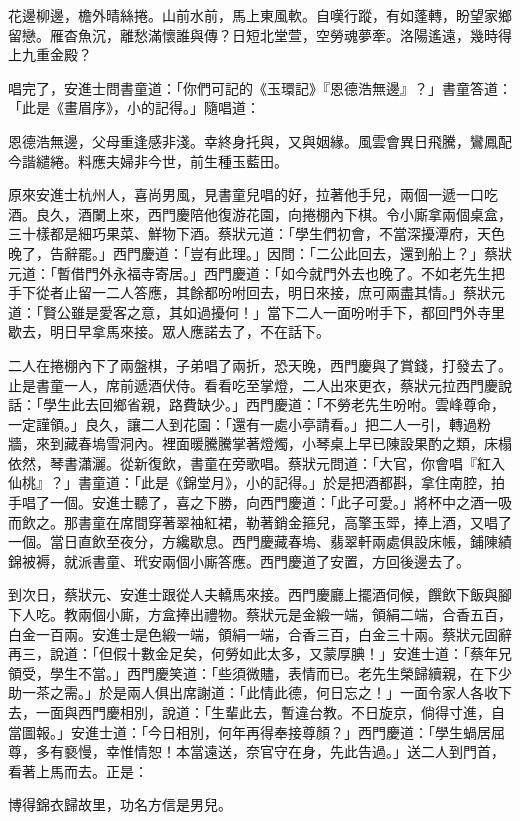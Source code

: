 花邊柳邊，檐外晴絲捲。山前水前，馬上東風軟。自嘆行蹤，有如蓬轉，盼望家鄉留戀。雁杳魚沉，離愁滿懷誰與傳？日短北堂萱，空勞魂夢牽。洛陽遙遠，幾時得上九重金殿？

唱完了，安進士問書童道：「你們可記的《玉環記》『恩德浩無邊』？」書童答道：「此是《畫眉序》，小的記得。」隨唱道：

恩德浩無邊，父母重逢感非淺。幸終身托與，又與姻緣。風雲會異日飛騰，鸞鳳配今諧繾綣。料應夫婦非今世，前生種玉藍田。

原來安進士杭州人，喜尚男風，見書童兒唱的好，拉著他手兒，兩個一遞一口吃酒。良久，酒闌上來，西門慶陪他復游花園，向捲棚內下棋。令小廝拿兩個桌盒，三十樣都是細巧果菜、鮮物下酒。蔡狀元道：「學生們初會，不當深擾潭府，天色晚了，告辭罷。」西門慶道：「豈有此理。」因問：「二公此回去，還到船上？」蔡狀元道：「暫借門外永福寺寄居。」西門慶道：「如今就門外去也晚了。不如老先生把手下從者止留一二人答應，其餘都吩咐回去，明日來接，庶可兩盡其情。」蔡狀元道：「賢公雖是愛客之意，其如過擾何！」當下二人一面吩咐手下，都回門外寺里歇去，明日早拿馬來接。眾人應諾去了，不在話下。

二人在捲棚內下了兩盤棋，子弟唱了兩折，恐天晚，西門慶與了賞錢，打發去了。止是書童一人，席前遞酒伏侍。看看吃至掌燈，二人出來更衣，蔡狀元拉西門慶說話：「學生此去回鄉省親，路費缺少。」西門慶道：「不勞老先生吩咐。雲峰尊命，一定謹領。」良久，讓二人到花園：「還有一處小亭請看。」把二人一引，轉過粉牆，來到藏春塢雪洞內。裡面暖騰騰掌著燈燭，小琴桌上早已陳設果酌之類，床榻依然，琴書瀟灑。從新復飲，書童在旁歌唱。蔡狀元問道：「大官，你會唱『紅入仙桃』？」書童道：「此是《錦堂月》，小的記得。」於是把酒都斟，拿住南腔，拍手唱了一個。安進士聽了，喜之下勝，向西門慶道：「此子可愛。」將杯中之酒一吸而飲之。那書童在席間穿著翠袖紅裙，勒著銷金箍兒，高擎玉斝，捧上酒，又唱了一個。當日直飲至夜分，方纔歇息。西門慶藏春塢、翡翠軒兩處俱設床帳，鋪陳績錦被褥，就派書童、玳安兩個小廝答應。西門慶道了安置，方回後邊去了。

到次日，蔡狀元、安進士跟從人夫轎馬來接。西門慶廳上擺酒伺候，饌飲下飯與腳下人吃。教兩個小廝，方盒捧出禮物。蔡狀元是金緞一端，領絹二端，合香五百，白金一百兩。安進士是色緞一端，領絹一端，合香三百，白金三十兩。蔡狀元固辭再三，說道：「但假十數金足矣，何勞如此太多，又蒙厚腆！」安進士道：「蔡年兄領受，學生不當。」西門慶笑道：「些須微贐，表情而已。老先生榮歸續親，在下少助一茶之需。」於是兩人俱出席謝道：「此情此德，何日忘之！」一面令家人各收下去，一面與西門慶相別，說道：「生輩此去，暫違台教。不日旋京，倘得寸進，自當圖報。」安進士道：「今日相別，何年再得奉接尊顏？」西門慶道：「學生蝸居屈尊，多有褻慢，幸惟情恕！本當遠送，奈官守在身，先此告過。」送二人到門首，看著上馬而去。正是：

博得錦衣歸故里，功名方信是男兒。

